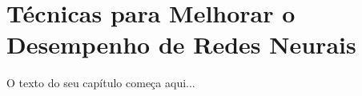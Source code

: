 
\chapter{Técnicas para Melhorar o Desempenho de Redes Neurais}
\label{cap:regularizacao}

O texto do seu capítulo começa aqui...